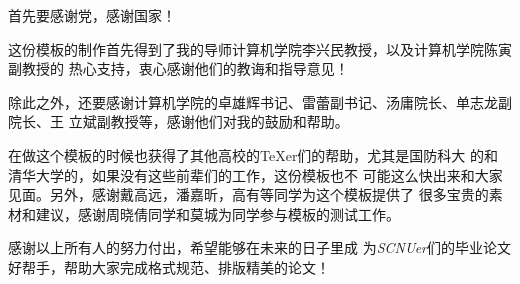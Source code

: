 

\begin{ack}

  首先要感谢党，感谢国家！
  
  这份模板的制作首先得到了我的导师计算机学院李兴民教授，以及计算机学院陈寅副教授的
  热心支持，衷心感谢他们的教诲和指导意见！

  除此之外，还要感谢计算机学院的卓雄辉书记、雷蕾副书记、汤庸院长、单志龙副院长、王
  立斌副教授等，感谢他们对我的鼓励和帮助。

  在做这个模板的时候也获得了其他高校的\TeX{}er们的帮助，尤其是国防科大
  的\nudtpaper{}和清华大学的\thuthesis{}，如果没有这些前辈们的工作，这份模板也不
  可能这么快出来和大家见面。另外，感谢戴高远，潘嘉昕，高有等同学为这个模板提供了
  很多宝贵的素材和建议，感谢周晓倩同学和莫城为同学参与模板的测试工作。

  感谢以上所有人的努力付出，希望\scnuthesis{}能够在未来的日子里成
  为\textit{SCNUer}们的毕业论文好帮手，帮助大家完成格式规范、排版精美的论文！

\end{ack}
